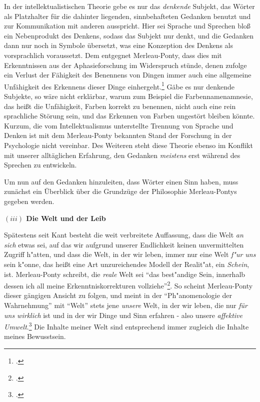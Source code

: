 \documentclass[a4paper, 12pt]{article}
\begin{document}
\begin{onehalfspace}
In der intellektualistischen Theorie gebe es nur das \emph{denkende} Subjekt, das Wörter als Platzhalter für die dahinter liegenden, sinnbehafteten Gedanken benutzt und zur Kommunikation mit anderen ausspricht. Hier sei Sprache und Sprechen bloß ein Nebenprodukt des Denkens, sodass das Subjekt nur denkt, und die Gedanken dann nur noch in Symbole übersetzt, was eine Konzeption des Denkens als vorsprachlich voraussetzt. Dem entgegnet Merleau-Ponty, dass dies mit Erkenntnissen aus der Aphasieforschung im Widerspruch stünde, denen zufolge ein Verlust der Fähigkeit des Benennens von Dingen immer auch eine allgemeine Unfähigkeit des Erkennens dieser Dinge einhergeht.\footnote{\Cite[Vgl.][S. 208 f.]{merleau1966phanomenologie}.} Gäbe es nur denkende Subjekte, so wäre nicht erklärbar, warum zum Beispiel die Farbennamenamnesie, das heißt die Unfähigkeit, Farben korrekt zu benennen, nicht auch eine rein sprachliche Störung sein, und das Erkennen von Farben ungestört bleiben könnte. Kurzum, die vom Intellektualismus unterstellte Trennung von Sprache und Denken ist mit dem Merleau-Ponty bekannten Stand der Forschung in der Psychologie nicht vereinbar. Des Weiteren steht diese Theorie ebenso im Konflikt mit unserer alltäglichen Erfahrung, den Gedanken \emph{meistens} erst während des Sprechen zu entwickeln.

Um nun auf den Gedanken hinzuleiten, dass Wörter einen Sinn haben, muss zunächst ein Überblick über die Grundzüge der Philosophie Merleau-Pontys gegeben werden.

\vspace{5mm}

\noindent\textbf{$(iii)$ Die Welt und der Leib}

\noindent Spätestens seit Kant besteht die weit verbreitete Auffassung, dass die Welt \emph{an sich} etwas sei, auf das wir aufgrund unserer Endlichkeit keinen unvermittelten Zugriff h"atten, und dass die Welt, in der wir leben, immer nur eine Welt \emph{f"ur uns} sein k"onne, das heißt eine Art unzureichendes Modell der Realit"at, ein \emph{Schein}, ist. Merleau-Ponty schreibt, die \emph{reale} Welt sei "`das best"andige Sein, innerhalb dessen ich all meine Erkenntniskorrekturen vollziehe"'\footnote{\Cite[Siehe][S. 379]{merleau1966phanomenologie}.}. So scheint Merleau-Ponty dieser gängigen Ansicht zu folgen, und meint in der "`Ph"anomenologie der Wahrnehmung"' mit "`Welt"' stets jene \emph{unsere} Welt, in der wir leben, die nur \emph{für uns wirklich} ist und in der wir Dinge und Sinn erfahren - also unsere \emph{affektive Umwelt}.\footnote{\Cite[Vgl.][S. 185]{merleau1966phanomenologie}.} Die Inhalte meiner Welt sind entsprechend immer zugleich die Inhalte meines Bewusstsein.


\end{onehalfspace}
\end{document}
